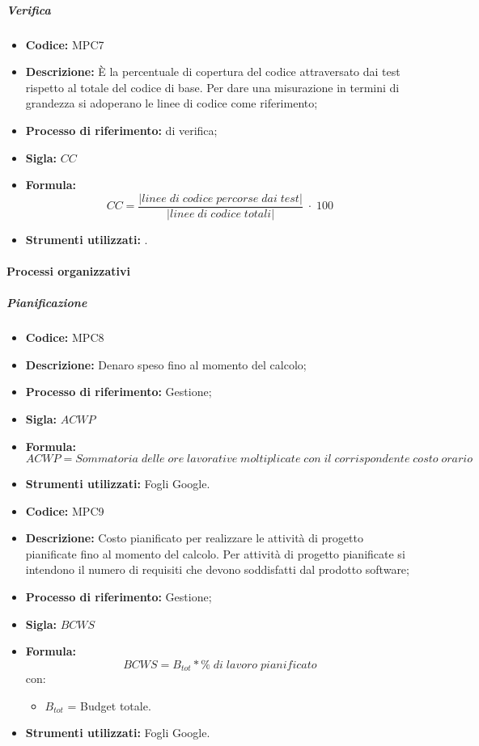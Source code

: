 \subparagraph{Verifica}
\begin{itemize}
	\item \textbf{Codice:} MPC7
	\item \textbf{Descrizione:} È la percentuale di copertura del codice attraversato dai test rispetto al totale del codice di base. Per dare una misurazione in termini di grandezza si adoperano le linee di codice come riferimento;
	\item \textbf{Processo di riferimento:}  di verifica;
	\item \textbf{Sigla:} $CC$
	\item \textbf{Formula:} $$CC = \frac{|linee \; di \; codice \; percorse \; dai  \; test|}{|linee \; di \; codice \; totali|} \; \cdot \; 100$$
	\item \textbf{Strumenti utilizzati:} .
\end{itemize}
    \paragraph{Processi organizzativi}

\subparagraph{Pianificazione}

    \begin{itemize}
        \item \textbf{Codice:} MPC8
        \item \textbf{Descrizione:} Denaro speso fino al momento del calcolo;
        \item \textbf{Processo di riferimento:} Gestione;
        \item \textbf{Sigla:} $ACWP$
        \item \textbf{Formula:} $$ACWP = {Sommatoria\; delle\; ore\; lavorative\; moltiplicate\; con\; il\; corrispondente\; costo\; orario}$$
        \item \textbf{Strumenti utilizzati:} Fogli Google.
    \end{itemize}

\begin{itemize}
	\item \textbf{Codice:} MPC9
    \item \textbf{Descrizione:} Costo pianificato per realizzare le attività di progetto pianificate fino al momento del calcolo.
    Per attività di progetto pianificate si intendono il numero di requisiti che devono soddisfatti dal prodotto software;
	\item \textbf{Processo di riferimento:} Gestione;
	\item \textbf{Sigla:} $BCWS$
	\item \textbf{Formula:} $$BCWS = {B_{tot} * \% \;di\; lavoro\; pianificato}$$
	con:
	\begin{itemize}
		\item $B_{tot}$ = Budget totale.
	\end{itemize}
	\item \textbf{Strumenti utilizzati:} Fogli Google.
\end{itemize}

